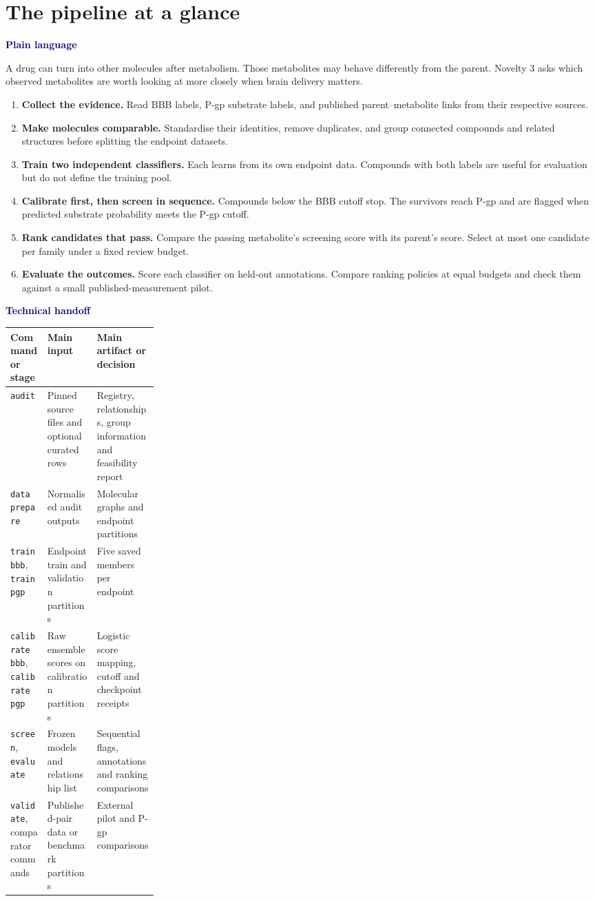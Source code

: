 \documentclass[11pt,a4paper]{article}
\newcommand{\code}[1]{\nolinkurl{#1}}
\newcommand{\cmd}[1]{\texttt{#1}}
\newcommand{\lead}[1]{\par\smallskip\textbf{\textcolor{Navy}{#1}}\par\nobreak}
\newcommand{\pagehead}[1]{\clearpage\section{#1}}
\newcommand{\dense}{\small\renewcommand{\arraystretch}{1.11}\setlength{\tabcolsep}{4pt}}
\begin{document}
\pagehead{The pipeline at a glance}\label{sec:flow}
\lead{Plain language}
A drug can turn into other molecules after metabolism. Those metabolites may behave differently from the parent. Novelty 3 asks which observed metabolites are worth looking at more closely when brain delivery matters.

\begin{enumerate}[leftmargin=*,itemsep=4pt]
\item \textbf{Collect the evidence.} Read BBB labels, P-gp substrate labels, and published parent--metabolite links from their respective sources.
\item \textbf{Make molecules comparable.} Standardise their identities, remove duplicates, and group connected compounds and related structures before splitting the endpoint datasets.
\item \textbf{Train two independent classifiers.} Each learns from its own endpoint data. Compounds with both labels are useful for evaluation but do not define the training pool.
\item \textbf{Calibrate first, then screen in sequence.} Compounds below the BBB cutoff stop. The survivors reach P-gp and are flagged when predicted substrate probability meets the P-gp cutoff.
\item \textbf{Rank candidates that pass.} Compare the passing metabolite's screening score with its parent's score. Select at most one candidate per family under a fixed review budget.
\item \textbf{Evaluate the outcomes.} Score each classifier on held-out annotations. Compare ranking policies at equal budgets and check them against a small published-measurement pilot.
\end{enumerate}

\lead{Technical handoff}
{\dense
\begin{tabularx}{\linewidth}{L{0.25\linewidth}YY}
\toprule
Command or stage & Main input & Main artifact or decision\\
\midrule
\code{audit} & Pinned source files and optional curated rows & Registry, relationships, group information and feasibility report\\
\cmd{data prepare} & Normalised audit outputs & Molecular graphs and endpoint partitions\\
\cmd{train bbb}, \cmd{train pgp} & Endpoint train and validation partitions & Five saved members per endpoint\\
\cmd{calibrate bbb}, \cmd{calibrate pgp} & Raw ensemble scores on calibration partitions & Logistic score mapping, cutoff and checkpoint receipts\\
\code{screen}, \code{evaluate} & Frozen models and relationship list & Sequential flags, annotations and ranking comparisons\\
\code{validate}, comparator commands & Published-pair data or benchmark partitions & External pilot and P-gp comparisons\\
\bottomrule
\end{tabularx}}
\end{document}
